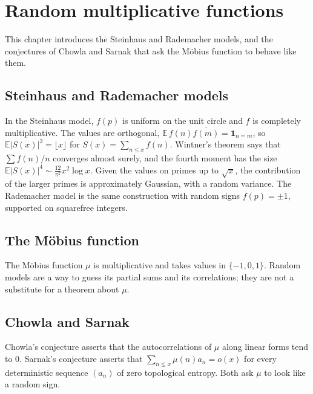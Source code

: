 \chapter{Random multiplicative functions}\label{ch:oc-multiplicative}

This chapter introduces the Steinhaus and Rademacher models, and the conjectures of Chowla and Sarnak that ask the M\"obius function to behave like them.

\section{Steinhaus and Rademacher models}

In the Steinhaus model, $f(p)$ is uniform on the unit circle and $f$ is completely multiplicative. The values are orthogonal, $\mathbb E\,f(n)\overline{f(m)}=\mathbf 1_{n=m}$, so $\mathbb E|S(x)|^2=\lfloor x\rfloor$ for $S(x)=\sum_{n\le x}f(n)$. Wintner's theorem says that $\sum f(n)/n$ converges almost surely, and the fourth moment has the size $\mathbb E|S(x)|^4\sim\frac{12}{\pi^2}x^2\log x$. Given the values on primes up to $\sqrt x$, the contribution of the larger primes is approximately Gaussian, with a random variance. The Rademacher model is the same construction with random signs $f(p)=\pm1$, supported on squarefree integers.

\section{The M\"obius function}

The M\"obius function $\mu$ is multiplicative and takes values in $\{-1,0,1\}$. Random models are a way to guess its partial sums and its correlations; they are not a substitute for a theorem about $\mu$.

\section{Chowla and Sarnak}

Chowla's conjecture asserts that the autocorrelations of $\mu$ along linear forms tend to $0$. Sarnak's conjecture asserts that $\sum_{n\le x}\mu(n)a_n=o(x)$ for every deterministic sequence $(a_n)$ of zero topological entropy. Both ask $\mu$ to look like a random sign.
